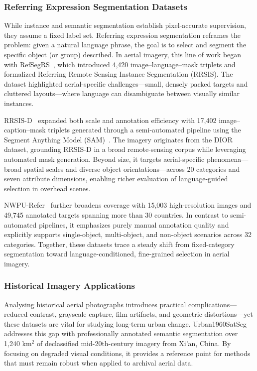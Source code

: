 \documentclass[journal]{IEEEtran}
\begin{document}
\subsubsection{Referring Expression Segmentation Datasets}

While instance and semantic segmentation establish pixel-accurate supervision, they assume a fixed label set. Referring expression segmentation reframes the problem: given a natural language phrase, the goal is to select and segment the specific object (or group) described. In aerial imagery, this line of work began with RefSegRS~\cite{yuan2023rrsis}, which introduced 4,420 image--language--mask triplets and formalized Referring Remote Sensing Instance Segmentation (RRSIS). The dataset highlighted aerial-specific challenges—small, densely packed targets and cluttered layouts—where language can disambiguate between visually similar instances.

RRSIS-D~\cite{liu2024rotated} expanded both scale and annotation efficiency with 17,402 image--caption--mask triplets generated through a semi-automated pipeline using the Segment Anything Model (SAM)~\cite{sam}. The imagery originates from the DIOR dataset, grounding RRSIS-D in a broad remote-sensing corpus while leveraging automated mask generation. Beyond size, it targets aerial-specific phenomena—broad spatial scales and diverse object orientations—across 20 categories and seven attribute dimensions, enabling richer evaluation of language-guided selection in overhead scenes.

NWPU-Refer~\cite{yang2024large} further broadens coverage with 15,003 high-resolution images and 49,745 annotated targets spanning more than 30 countries. In contrast to semi-automated pipelines, it emphasizes purely manual annotation quality and explicitly supports single-object, multi-object, and non-object scenarios across 32 categories. Together, these datasets trace a steady shift from fixed-category segmentation toward language-conditioned, fine-grained selection in aerial imagery.

\subsubsection{Historical Imagery Applications}

Analysing historical aerial photographs introduces practical complications—reduced contrast, grayscale capture, film artifacts, and geometric distortions—yet these datasets are vital for studying long-term urban change. Urban1960SatSeg~\cite{hao2025urban1960satseg} addresses this gap with professionally annotated semantic segmentation over 1,240 km$^2$ of declassified mid-20th-century imagery from Xi'an, China. By focusing on degraded visual conditions, it provides a reference point for methods that must remain robust when applied to archival aerial data.
\end{document}
